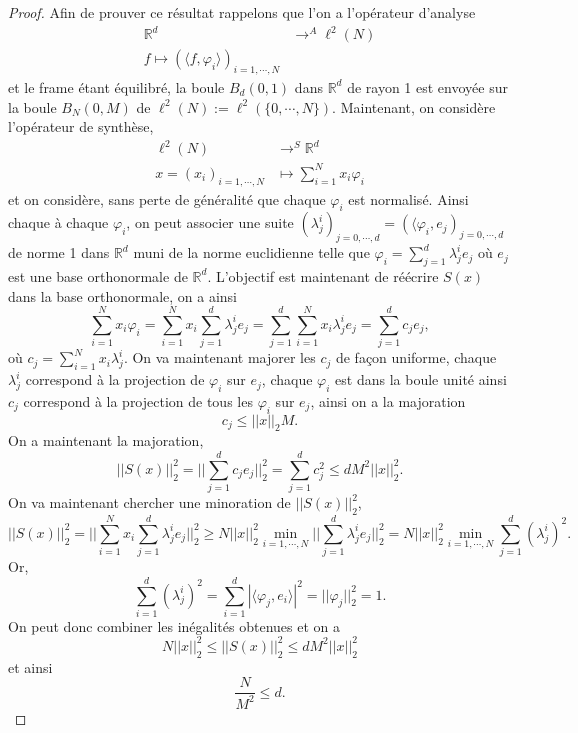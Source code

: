 \begin{proof}
	Afin de prouver ce résultat rappelons que l'on a l'opérateur d'analyse
	\begin{align}
		\mathbb{R}^d &\longrightarrow^A \ell^2(N)\\
		f \longmapsto (\langle f, \varphi_i \rangle)_{i=1,\cdots, N}
	\end{align}
	et le frame étant équilibré, la boule $B_d(0,1)$ dans $\mathbb{R}^d$ de rayon 1 est envoyée sur la boule $B_N(0,M)$ de $\ell^2(N) := \ell^2(\{0, \cdots, N\})$.
	Maintenant, on considère l'opérateur de synthèse,
	\begin{align}
		\ell^2(N) &\longrightarrow^S \mathbb{R}^d\\
		x=(x_i)_{i=1, \cdots, N} &\longmapsto \sum_{i=1}^N x_i \varphi_i
	\end{align}
	et on considère, sans perte de généralité que chaque $\varphi_i$ est normalisé. Ainsi chaque à chaque $\varphi_i$, on peut associer une suite $(\lambda_j^i)_{j=0, \cdots, d}=(\langle \varphi_i, e_j)_{j=0,\cdots, d}$ de norme 1 dans $\mathbb{R}^d$ muni de la norme euclidienne telle que $\varphi_i = \sum_{j=1}^d \lambda_j^i e_j$ où $e_j$ est une base orthonormale de $\mathbb{R}^d$. 
	L'objectif est maintenant de réécrire $S(x)$ dans la base orthonormale, on a ainsi
	\begin{equation}
		\sum_{i=1}^N x_i \varphi_i = \sum_{i=1}^N x_i \sum_{j=1}^d \lambda_j^i e_j = \sum_{j=1}^d \sum_{i=1}^N x_i \lambda_j^ie_j =\sum_{j=1}^d c_j e_j,
	\end{equation}
	où $c_j = \sum_{i=1}^Nx_i\lambda_j^i$. On va maintenant majorer les $c_j$ de façon uniforme, chaque $\lambda_j^i$ correspond à la projection de $\varphi_i$ sur $e_j$, chaque $\varphi_i$ est dans la boule unité ainsi $c_j$ correspond à la projection de tous les $\varphi_i$ sur $e_j$, ainsi on a la majoration
	\begin{equation}
		c_j \leq ||x||_2 M.
	\end{equation}
	On a maintenant la majoration,
	\begin{equation}
		||S (x)||^2_2 = ||\sum_{j=1}^d c_j e_j||_2^2= \sum_{j=1}^d c_j^2 \leq d M^2||x||_2^2. 
	\end{equation}
	On va maintenant chercher une minoration de $||S(x)||_2^2$,
	\begin{equation}
		||S(x)||_2^2 = ||\sum_{i=1}^N x_i \sum_{j=1}^d \lambda_j^i e_j||_2^2 \geq N||x||_2^2 \min_{i=1, \cdots, N} ||\sum_{j=1}^d \lambda_j^i e_j||_2^2 = N||x||_2^2 \min_{i=1, \cdots, N}\sum_{j=1}^d (\lambda_j^i)^2.
	\end{equation}
	Or,
	\begin{equation}
		\sum_{i=1}^d (\lambda_j^i)^2 = \sum_{i=1}^d |\langle \varphi_j, e_i \rangle|^2 =||\varphi_j||_2^2=1.  
	\end{equation}
	On peut donc combiner les inégalités obtenues et on a
	\begin{equation}
		N ||x||_2^2 \leq ||S(x)||_2^2 \leq d M^2||x||_2^2
	\end{equation}
	et ainsi
	\begin{equation}
		\frac{N}{M^2} \leq d.
	\end{equation}
\end{proof}
